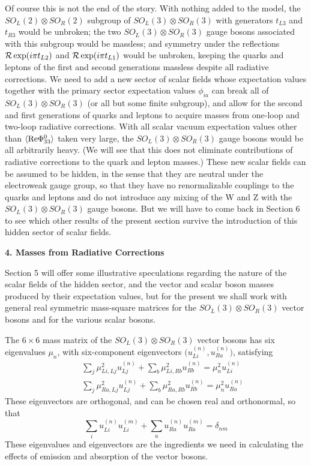 Of course this is not the end of the story.  With nothing added to the model,  the  $SO_L(2)\otimes  SO_R(2)$ subgroup of $SO_L(3)\otimes  SO_R(3)$ with generators $t_{L3}$ and $t_{R3}$ would be unbroken; the two $SO_L(3)\otimes  SO_R(3)$ gauge bosons associated with this subgroup would be massless;  and symmetry under the reflections ${\cal R}\exp(i\pi t_{L2})$ and ${\cal R}\exp(i\pi t_{L1})$ would be unbroken, keeping the quarks and leptons of the first and second generations massless despite all radiative corrections.  We need to add a new sector of  scalar fields whose expectation values together with the primary sector expectation values $\phi_{ia}$ can break all of $SO_L(3)\otimes  SO_R(3)$ (or all but some finite subgroup), and allow for the  second and first generations of quarks and leptons to acquire  masses from one-loop and two-loop  radiative corrections.  With all scalar vacuum expectation values other than $\langle{\rm Re}\Phi^0_{33}\rangle$ taken very large, the $SO_L(3)\otimes  SO_R(3)$ gauge bosons would be all arbitrarily heavy.
(We will see that this does not eliminate contributions of radiative corrections to the quark and lepton masses.)  These new  scalar fields can be assumed to be hidden, in the sense that they are neutral under the electroweak gauge group, so that they have no renormalizable couplings to the quarks and leptons and do not introduce any mixing of the W  and Z with the $SO_L(3)\otimes  SO_R(3)$ gauge bosons.  But we will have to come back in Section 6 to see which other results of the present section survive the introduction of this hidden sector of scalar fields.




\begin{center}
{\bf 4.  Masses from Radiative Corrections}
\end{center}

  
Section 5 will offer some illustrative speculations regarding the nature of the scalar fields of the hidden sector, and the vector and scalar boson masses produced by their expectation values, but for the present we shall work with  general real symmetric mass-square  matrices for the $SO_L(3)\otimes  SO_R(3)$ vector bosons and for the various scalar bosons.   

The $6\times 6$ mass matrix of the $SO_L(3)\otimes  SO_R(3)$ vector bosons has six eigenvalues $\mu_n$, with six-component eigenvectors $\Big(u^{(n)}_{Li},u^{(n)}_{Ra}\Big)$, satisfying
\begin{eqnarray} 
&&\sum_j \mu^2_{Li,Lj}u^{(n)}_{Lj}+\sum_b \mu^2_{Li,Rb}u^{(n)}_{Rb}=\mu_n^2 u^{(n)}_{Li}\nonumber\\&&
\sum_j \mu^2_{Ra,Lj}u^{(n)}_{Lj}+\sum_b \mu^2_{Ra,Rb}u^{(n)}_{Rb}=\mu_n^2 u^{(n)}_{Ra}
\end{eqnarray}
These eigenvectors are orthogonal, and can be chosen real and orthonormal, so that
\begin{equation}
 \sum_i u^{(n)}_{Li}u^{(m)}_{Li}+\sum_a u^{(n)}_{Ra}u^{(m)}_{Ra}=\delta_{nm}
\end{equation}
These eigenvalues and eigenvectors are the ingredients we need in calculating the effects of emission and absorption of the vector bosons.





